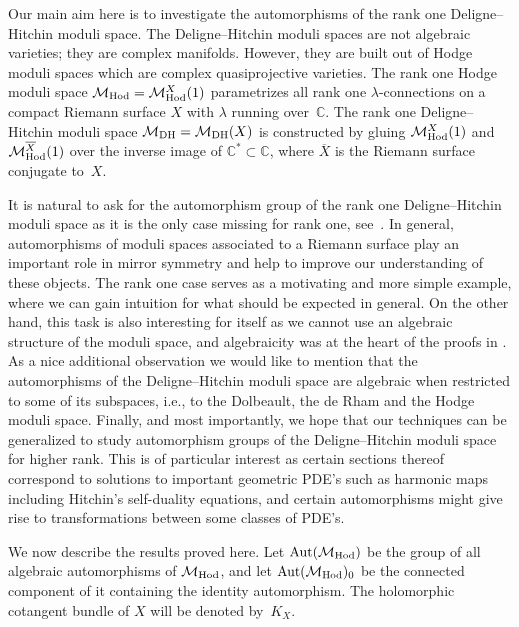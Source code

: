 \documentclass[pdftex]{sigma}
\numberwithin{equation}{section}
\begin{document}
Our main aim here is to investigate the automorphisms of the rank one Deligne--Hitchin moduli space. The Deligne--Hitchin moduli spaces are not algebraic varieties; they are complex manifolds. However, they are built out of Hodge moduli spaces which are complex quasiprojective varieties. The rank one Hodge moduli space ${\mathcal M}_{\rm Hod} = {\mathcal M}^X_{\rm Hod}(1)$ parametrizes all rank one $\lambda$-connections on a compact Riemann surface $X$ with $\lambda$ running over~$\mathbb C$. The rank one Deligne--Hitchin moduli space ${\mathcal M}_{\rm DH} = {\mathcal M}_{\rm DH}(X)$ is constructed by gluing ${\mathcal M}^X_{\rm Hod}(1)$ and ${\mathcal M}^{\overline X}_{\rm Hod}(1)$ over the inverse image of ${\mathbb C}^* \subset {\mathbb C}$, where ${\overline X}$ is the Riemann surface conjugate to~$X$.

It is natural to ask for the automorphism group of the rank one Deligne--Hitchin moduli space as it is the only case missing for rank one, see~\cite{BBS}. In general, automorphisms of moduli spaces associated to a Riemann surface play an important role in mirror symmetry and help to improve our understanding of these objects. The rank one case serves as a motivating and more simple example, where we can gain intuition for what should be expected in general. On the other hand, this task is also interesting for itself as we cannot use an algebraic structure of the moduli space, and algebraicity was at the heart of the proofs in \cite{BBS}. As a nice additional observation we would like to mention that the automorphisms of the Deligne--Hitchin moduli space are algebraic when restricted to some of its subspaces, i.e., to the Dolbeault, the de Rham and the Hodge moduli space. Finally, and most importantly, we hope that our techniques can be generalized to study automorphism groups of the Deligne--Hitchin moduli space for higher rank. This is of particular interest as certain sections thereof correspond to solutions to important geometric PDE's such as harmonic maps including Hitchin's self-duality equations, and certain automorphisms might give rise to transformations between some classes of PDE's.

We now describe the results proved here. Let $\operatorname{Aut}({\mathcal M}_{\rm Hod})$ be the group of all algebraic automorphisms of ${\mathcal M}_{\rm Hod}$, and let $\operatorname{Aut}({\mathcal M}_{\rm Hod})_0$ be the connected component of it containing the identity automorphism. The holomorphic cotangent bundle of $X$ will be denoted by~$K_X$.
\end{document}

